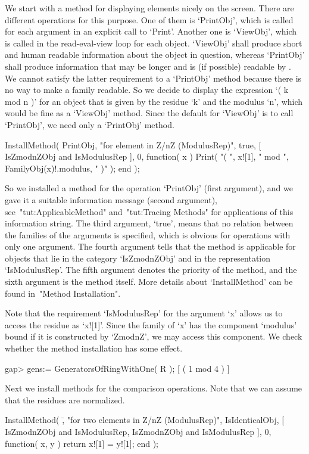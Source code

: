 We start with a method for displaying elements nicely on the screen.
There are different operations for this purpose.
One of them is `PrintObj', which is called for each argument in an
explicit call to `Print'.
Another one is `ViewObj', which is called in the read-eval-view loop
for each object.
`ViewObj' shall produce short and human readable information about the
object in question, whereas `PrintObj' shall produce information that
may be longer and is (if possible) readable by {\GAP}.
We cannot satisfy the latter requirement to a `PrintObj' method
because there is no way to make a family {\GAP} readable.
So we decide to display the expression `( k mod n )' for an object
that is given by the residue `k' and the modulus `n',
which would be fine as a `ViewObj' method.
Since the default for `ViewObj' is to call `PrintObj',
we need only a `PrintObj' method.

\begintt
    InstallMethod( PrintObj,
        "for element in Z/nZ (ModulusRep)",
        true,
        [ IsZmodnZObj and IsModulusRep ], 0,
        function( x )
        Print( "( ", x![1], " mod ", FamilyObj(x)!.modulus, " )" );
        end );
\endtt

So we installed a method for the operation `PrintObj' (first argument),
and we gave it a suitable information message (second argument),
see~"tut:ApplicableMethod" and~"tut:Tracing Methods" for applications of
this information string.
The third argument, `true', means that no relation between the families
of the arguments is specified, which is obvious for operations with only
one argument.
The fourth argument tells {\GAP} that the method is applicable for
objects that lie in the category `IsZmodnZObj' and in the representation
`IsModulusRep'.
The fifth argument denotes the priority of the method,
and the sixth argument is the method itself.
More details about `InstallMethod' can be found in~"Method Installation".

Note that the requirement `IsModulusRep' for the argument `x' allows us
to access the residue as `x![1]'.
Since the family of `x' has the component `modulus' bound if it is
constructed by `ZmodnZ', we may access this component.
We check whether the method installation has some effect.

\begintt
    gap> gens:= GeneratorsOfRingWithOne( R );
    [ ( 1 mod 4 ) ]
\endtt

Next we install methods for the comparison operations.
Note that we can assume that the residues are normalized.

\begintt
    InstallMethod( \=,
        "for two elements in Z/nZ (ModulusRep)",
        IsIdenticalObj,
        [ IsZmodnZObj and IsModulusRep, IsZmodnZObj and IsModulusRep ],
        0,
        function( x, y ) return x![1] = y![1]; end );

